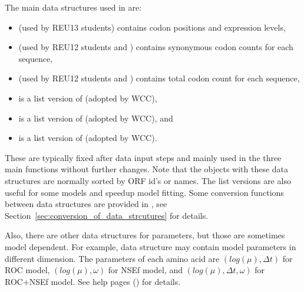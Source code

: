 The main data structures used in  are:
\begin{itemize}
\item {} (used by REU13 students)
      contains codon positions and expression levels,
\item {} 
      (used by REU12 students and \citet{Wallace2013})
      contains synonymous codon counts for each sequence,
\item {} 
      (used by REU12 students and \citet{Wallace2013})
      contains total codon count for each sequence,
\item {} is a list version of  (adopted by WCC),
\item {} is a list version of  (adopted by WCC), and
\item {} is a list version of  (adopted by WCC).
\end{itemize}
These are typically fixed after data input steps and
mainly used in the three main functions without further changes.
Note that the objects with these data structures are normally sorted
by ORF id's or names. The list versions are also useful for some models
and speedup model fitting. Some conversion functions between data structures
are provided in , see
Section~\ref{sec:conversion_of_data_strcutures} for details.

Also, there are other data structures for parameters, but those are
sometimes model dependent. For example, data structure  may contain
model parameters in different dimension.
The parameters of each amino acid are
$(log(\mu), \Delta t)$ for ROC model,
$(log(\mu), \omega)$ for NSEf model, and
$(log(\mu), \Delta t, \omega)$ for ROC+NSEf model.
See help pages () for details.

